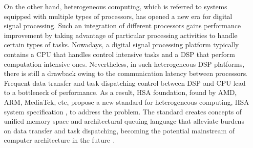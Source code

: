 \documentclass[12pt]{article}
\begin{document}
\begin{CJK}{UTF8}{bkai}
        On the other hand, heterogeneous computing, which is referred to systems equipped with multiple types of processors, has opened a new era for digital signal processing. 
        Such an integration of different processors gains performance improvement by taking advantage of particular processing activities to handle certain types of tasks.
        Nowadays, a digital signal processing platform typically contains a CPU that handles control intensive tasks and a DSP that perform computation intensive ones.
        Nevertheless, in such heterogeneous DSP platforms, there is still a drawback owing to the communication latency between processors. 
        Frequent data transfer and task dispatching control between DSP and CPU lead to a  bottleneck of performance. 
        As a result, HSA foundation, found by AMD, ARM, MediaTek, etc, propose a new standard for heterogeneous computing, HSA system specification \cite{systemspec}, to address the problem. 
        The standard creates concepts of unified memory space and architectural queuing language that alleviate burdens on data transfer and task dispatching, becoming the potential mainstream of computer architecture in the future \cite{mainstream}.


\end{CJK}
\end{document}
